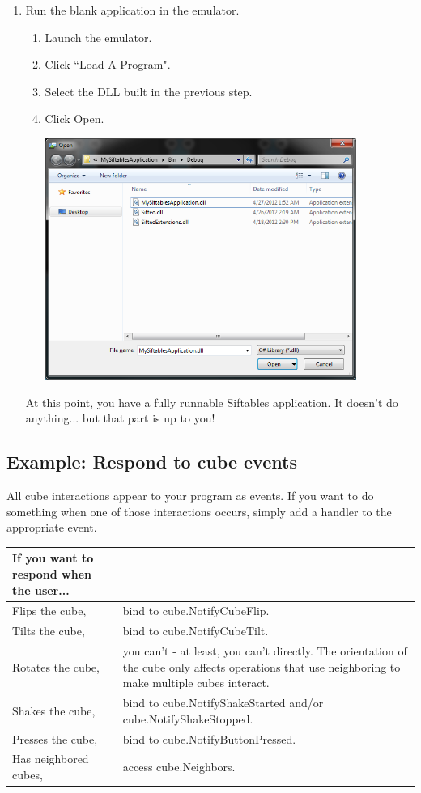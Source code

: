 \documentclass[12pt]{article}
\begin{document}
\begin{enumerate}
\item Run the blank application in the emulator.
\begin{enumerate}
\item Launch the emulator.
\item Click ``Load A Program".
\item Select the DLL built in the previous step.
\item Click Open.
\begin{center}\includegraphics[width=4in]{3-1Open}\end{center}
\end{enumerate}
At this point, you have a fully runnable Siftables application. It doesn't do anything... but that part is up to you!\\

\end{enumerate}

\subsection{Example: Respond to cube events}
All cube interactions appear to your program as events. If you want to do something when one of those interactions occurs, simply add a handler to the appropriate event.

	\begin{tabular}{ | p{2in} | p{4in} | }
	\hline
	\textbf{If you want to respond when the user...}   \\\hline
	Flips the cube,  & bind to cube.NotifyCubeFlip. \\\hline
	Tilts the cube, & bind to cube.NotifyCubeTilt. \\\hline
	Rotates the cube, & you can't - at least, you can't directly. The orientation of the cube only affects operations that use neighboring to make multiple cubes interact. \\\hline
	Shakes the cube, & bind to cube.NotifyShakeStarted and/or cube.NotifyShakeStopped. \\\hline
	Presses the cube, & bind to cube.NotifyButtonPressed. \\\hline
	Has neighbored cubes, & access cube.Neighbors. \\\hline
	\end{tabular}\\
	
\end{document}
